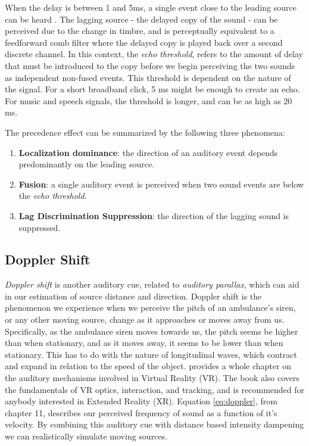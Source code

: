 When the delay is between 1 and 5ms, a single event close to the leading source can be heard \cite{hacihabiboglu2017perceptual}. The lagging source - the delayed copy of the sound - can be perceived due to the change in timbre, and is perceptually equivalent to a feedforward comb filter where the delayed copy is played back over a second discrete channel. In this context, the \textit{echo threshold}, refers to the amount of delay that must be introduced to the copy before we begin perceiving the two sounds as independent non-fused events. This threshold is dependent on the nature of the signal. For a short broadband click, 5 ms might be enough to create an echo. For music and speech signals, the threshold is longer, and can be as high as 20 ms.

The precedence effect can be summarized by the following three phenomena: 


\begin{enumerate}
    \item \textbf{Localization dominance}: the direction of an auditory event depends predominantly on the leading source.
    \item \textbf{Fusion}: a single auditory event is perceived when two sound events are below the \textit{echo threshold}.
    \item \textbf{Lag Discrimination Suppression}: the direction of the lagging sound is suppressed.  
\end{enumerate}

\subsection{Doppler Shift}

\textit{Doppler shift} is another auditory cue, related to \textit{auditory parallax}, which can aid in our estimation of source distance and direction. Doppler shift is the phenomenon we experience when we perceive the pitch of an ambulance's siren, or any other moving source, change as it approaches or moves away from us. Specifically, as the ambulance siren moves towards us, the pitch seems be higher than when stationary, and as it moves away, it seems to be lower than when stationary. This has to do with the nature of longitudinal waves, which contract and expand in relation to the speed of the object. \cite{lavalle2016virtual} provides a whole chapter on the auditory mechanisms involved in Virtual Reality (VR). The book also covers the fundamentals of VR optics, interaction, and tracking, and is recommended for anybody interested in Extended Reality (XR). Equation \ref{eq:doppler}, from chapter 11, describes our perceived frequency of sound as a function of it's velocity. By combining this auditory cue with distance based intensity dampening we can realistically simulate moving sources.


